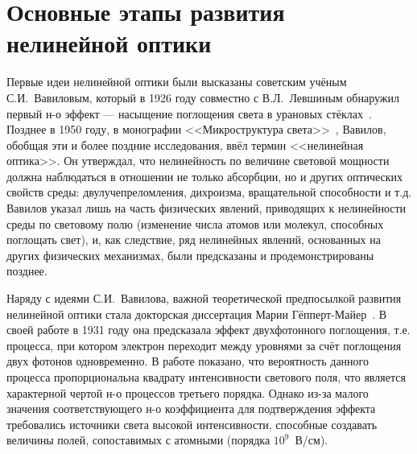 \section{Основные этапы развития нелинейной оптики}\label{sec:chFiber3/fiberHist}

Первые идеи нелинейной оптики были высказаны советским учёным С.И.~Вавиловым, который в 1926 году совместно с В.Л.~Левшиным обнаружил первый н-о эффект — насыщение поглощения света в урановых стёклах~\cite{lukishova2019first}. Позднее в 1950 году, в монографии <<Микроструктура света>>~\cite{vavilov1950}, Вавилов, обобщая эти и более поздние исследования, ввёл термин <<нелинейная оптика>>. Он утверждал, что нелинейность по величине световой мощности должна наблюдаться в отношении не только абсорбции, но и других оптических свойств среды: двулучепреломления, дихроизма, вращательной способности и т.д. Вавилов указал лишь на часть физических явлений, приводящих к нелинейности среды по световому полю (изменение числа атомов или молекул, способных поглощать свет), и, как следствие, ряд  нелинейных явлений, основанных на других физических механизмах, были предсказаны и продемонстрированы позднее. 

Наряду с идеями С.И.~Вавилова, важной теоретической предпосылкой развития нелинейной оптики стала докторская диссертация Марии Гёпперт-Майер~\cite{goppert1931elementarakte}. В своей работе в 1931 году она предсказала эффект двухфотонного поглощения, т.е. процесса, при котором электрон переходит между уровнями за счёт поглощения двух фотонов одновременно. В работе показано, что вероятность данного процесса пропорциональна квадрату интенсивности светового поля, что является характерной чертой н-о процессов третьего порядка. Однако из-за малого значения соответствующего н-о коэффициента для подтверждения эффекта требовались источники света высокой интенсивности, способные создавать величины полей, сопоставимых с атомными (порядка $10^{9}$~В/см). 

